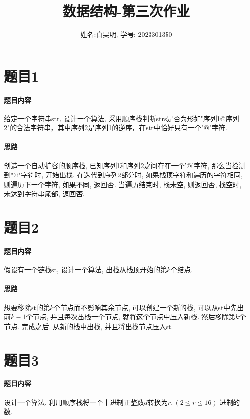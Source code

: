 \documentclass[a4paper]{article}
\title{数据结构-第三次作业}
\author{姓名:白昊明, 学号: 2023301350}
\begin{document}
\maketitle
\section*{题目1}

\paragraph*{题目内容} 给定一个字符串str, 设计一个算法, 采用顺序栈判断strs是否为形如"序列1@序列2"的合法字符串，其中序列2是序列1的逆序，在str中恰好只有一个"@"字符.

\paragraph*{思路} 创造一个自动扩容的顺序栈, 已知序列1和序列2之间存在一个'@'字符, 那么当检测到"@"字符时, 开始出栈. 在迭代到序列2部分时, 如果栈顶字符和遍历的字符相同, 则遍历下一个字符, 如果不同, 返回否. 当遍历结束时, 栈未空, 则返回否, 栈空时, 未达到字符串尾部, 返回否.



\section*{题目2}

\paragraph*{题目内容} 假设有一个链栈st, 设计一个算法, 出栈从栈顶开始的第$k$个结点.

\paragraph*{思路} 想要移除st的第$k$个节点而不影响其余节点, 可以创建一个新的栈, 可以从st中先出前$k-1$个节点, 并且每次出栈一个节点, 就将这个节点中压入新栈. 然后移除第$k$个节点. 完成之后, 从新的栈中出栈, 并且将出栈节点压入st.



\section*{题目3}

\paragraph*{题目内容} 设计一个算法, 利用顺序栈将一个十进制正整数$d$转换为$r, (2\leq r \leq 16)$ 进制的数.
\end{document}
